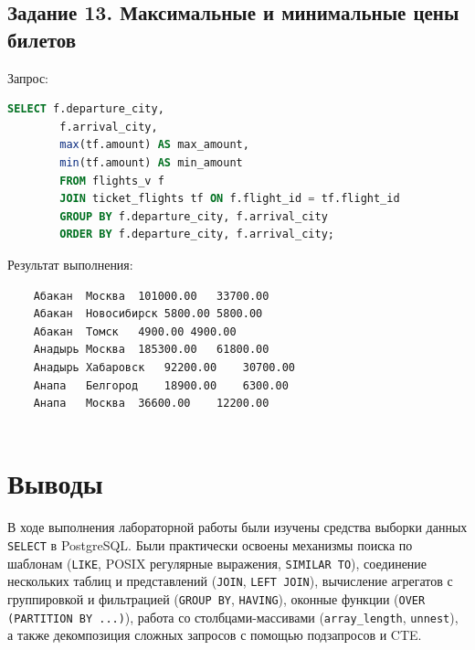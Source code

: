 \documentclass{bmstu-sob}
\begin{document}
	\subsection{Задание 13. Максимальные и минимальные цены билетов}
	Запрос:
	\begin{lstlisting}[language=SQL]
		SELECT f.departure_city,
		f.arrival_city,
		max(tf.amount) AS max_amount,
		min(tf.amount) AS min_amount
		FROM flights_v f
		JOIN ticket_flights tf ON f.flight_id = tf.flight_id
		GROUP BY f.departure_city, f.arrival_city
		ORDER BY f.departure_city, f.arrival_city;
	\end{lstlisting}
	Результат выполнения:
	\begin{lstlisting}
	Абакан	Москва	101000.00	33700.00
	Абакан	Новосибирск	5800.00	5800.00
	Абакан	Томск	4900.00	4900.00
	Анадырь	Москва	185300.00	61800.00
	Анадырь	Хабаровск	92200.00	30700.00
	Анапа	Белгород	18900.00	6300.00
	Анапа	Москва	36600.00	12200.00
	
	\end{lstlisting}
	
	\section{Выводы}
	
	В ходе выполнения лабораторной работы были изучены средства выборки данных \texttt{SELECT} в PostgreSQL. Были практически освоены механизмы поиска по шаблонам (\texttt{LIKE}, POSIX регулярные выражения, \texttt{SIMILAR TO}), соединение нескольких таблиц и представлений (\texttt{JOIN}, \texttt{LEFT JOIN}), вычисление агрегатов с группировкой и фильтрацией (\texttt{GROUP BY}, \texttt{HAVING}), оконные функции (\texttt{OVER (PARTITION BY ...)}), работа со столбцами-массивами (\texttt{array\_length}, \texttt{unnest}), а также декомпозиция сложных запросов с помощью подзапросов и CTE.
	
\end{document}
